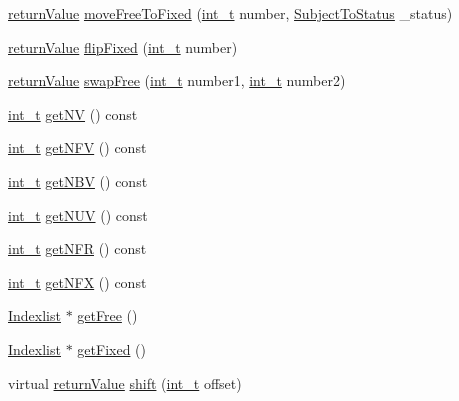 \begin{DoxyCompactItemize}
\item 
\hyperlink{_message_handling_8hpp_a81d556f613bfbabd0b1f9488c0fa865e}{return\+Value} \hyperlink{class_bounds_aab5c2198d2ad6e57fd1d7ab513f1b894}{move\+Free\+To\+Fixed} (\hyperlink{_types_8hpp_ab6fd6105e64ed14a0c9281326f05e623}{int\+\_\+t} number, \hyperlink{_types_8hpp_a70a6a40d261a015ead8d43aa589383a4}{Subject\+To\+Status} \+\_\+status)
\item 
\hyperlink{_message_handling_8hpp_a81d556f613bfbabd0b1f9488c0fa865e}{return\+Value} \hyperlink{class_bounds_a161a0615c8a76dc82c373691b4dd6eb5}{flip\+Fixed} (\hyperlink{_types_8hpp_ab6fd6105e64ed14a0c9281326f05e623}{int\+\_\+t} number)
\item 
\hyperlink{_message_handling_8hpp_a81d556f613bfbabd0b1f9488c0fa865e}{return\+Value} \hyperlink{class_bounds_a8fb8a0534a0a112e227aa073d82d56de}{swap\+Free} (\hyperlink{_types_8hpp_ab6fd6105e64ed14a0c9281326f05e623}{int\+\_\+t} number1, \hyperlink{_types_8hpp_ab6fd6105e64ed14a0c9281326f05e623}{int\+\_\+t} number2)
\item 
\hyperlink{_types_8hpp_ab6fd6105e64ed14a0c9281326f05e623}{int\+\_\+t} \hyperlink{class_bounds_a2c32c7cbab64f671ffecca74a3253d1b}{get\+NV} () const
\item 
\hyperlink{_types_8hpp_ab6fd6105e64ed14a0c9281326f05e623}{int\+\_\+t} \hyperlink{class_bounds_a05acda6c3a05e943824fd08933d4074a}{get\+N\+FV} () const
\item 
\hyperlink{_types_8hpp_ab6fd6105e64ed14a0c9281326f05e623}{int\+\_\+t} \hyperlink{class_bounds_a83878b515f0ecbf38f6cbea483711f17}{get\+N\+BV} () const
\item 
\hyperlink{_types_8hpp_ab6fd6105e64ed14a0c9281326f05e623}{int\+\_\+t} \hyperlink{class_bounds_a0ce0865020cd26cd38f24e1b2d692fd0}{get\+N\+UV} () const
\item 
\hyperlink{_types_8hpp_ab6fd6105e64ed14a0c9281326f05e623}{int\+\_\+t} \hyperlink{class_bounds_ad67174ea575c43b1dd4b9da24f3a8a2a}{get\+N\+FR} () const
\item 
\hyperlink{_types_8hpp_ab6fd6105e64ed14a0c9281326f05e623}{int\+\_\+t} \hyperlink{class_bounds_ae1b40d3aec87bd2ee9d03e3c0d2aeb0c}{get\+N\+FX} () const
\item 
\hyperlink{class_indexlist}{Indexlist} $\ast$ \hyperlink{class_bounds_abc066244b45e507c77edb14ad57a8370}{get\+Free} ()
\item 
\hyperlink{class_indexlist}{Indexlist} $\ast$ \hyperlink{class_bounds_a4e2397e0080e4cbc355ffcf386fda8a0}{get\+Fixed} ()
\item 
virtual \hyperlink{_message_handling_8hpp_a81d556f613bfbabd0b1f9488c0fa865e}{return\+Value} \hyperlink{class_bounds_a05b63d074b95ae4d5fc4c7cfe11e7228}{shift} (\hyperlink{_types_8hpp_ab6fd6105e64ed14a0c9281326f05e623}{int\+\_\+t} offset)

\end{DoxyCompactItemize}
